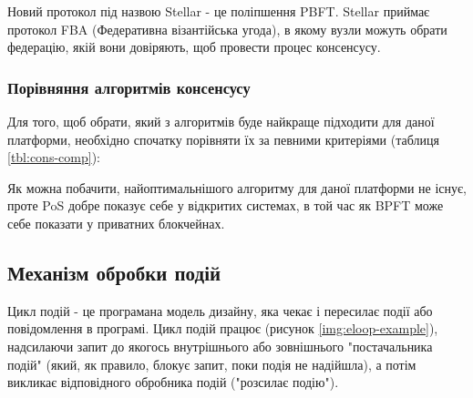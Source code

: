 \documentclass{lib/styles/default-style}
\begin{document}
    Новий протокол під назвою Stellar - це поліпшення PBFT.
    Stellar приймає протокол FBA (Федеративна візантійська угода), в якому вузли можуть обрати федерацію,
    якій вони довіряють, щоб провести процес консенсусу.

    \subsubsection{Порівняння алгоритмів консенсусу}

    Для того, щоб обрати, який з алгоритмів буде найкраще підходити для
    даної платформи, необхідно спочатку порівняти їх за певними критеріями (таблиця \ref{tbl:cons-comp}):

    
    Як можна побачити, найоптимальнішого алгоритму для даної платформи не існує, проте PoS добре показує себе у відкритих системах,
    в той час як BPFT може себе показати у приватних блокчейнах.

\subsection{Механізм обробки подій}

    Цикл подій - це програмана модель дизайну, яка чекає і пересилає події або повідомлення в програмі.
    Цикл подій працює (рисунок \ref{img:eloop-example}), надсилаючи запит до якогось внутрішнього або зовнішнього "постачальника подій"
    (який, як правило, блокує запит, поки подія не надійшла), а потім викликає відповідного обробника подій ("розсилає подію").

\end{document}

